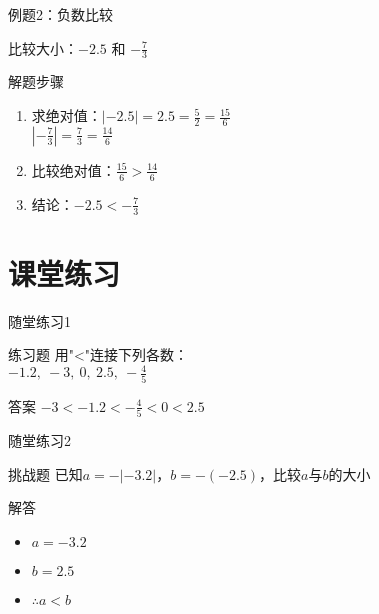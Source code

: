 \documentclass{ctexbeamer}
\begin{document}
\begin{frame}{例题2：负数比较}
    \begin{example}
        比较大小：$-2.5$ 和 $-\frac{7}{3}$
    \end{example}
    
    \pause
    \begin{block}{解题步骤}
        \begin{enumerate}
            \item 求绝对值：$| -2.5 | = 2.5 = \frac{5}{2} = \frac{15}{6}$\\
            $| -\frac{7}{3} | = \frac{7}{3} = \frac{14}{6}$
            \item 比较绝对值：$\frac{15}{6} > \frac{14}{6}$
            \item 结论：$-2.5 < -\frac{7}{3}$
        \end{enumerate}
    \end{block}
\end{frame}

\section{课堂练习}
\begin{frame}{随堂练习1}
    \begin{block}{练习题}
        用"<"连接下列各数：\\
        $-1.2,\ -3,\ 0,\ 2.5,\ -\frac{4}{5}$
    \end{block}
    
    \pause
    \begin{alertblock}{答案}
        $-3 < -1.2 < -\frac{4}{5} < 0 < 2.5$
    \end{alertblock}
\end{frame}

\begin{frame}{随堂练习2}
    \begin{block}{挑战题}
        已知$a = -|-3.2|$，$b = -(-2.5)$，比较$a$与$b$的大小
    \end{block}
    
    \pause
    \begin{alertblock}{解答}
        \begin{itemize}
            \item $a = -3.2$
            \item $b = 2.5$
            \item $\therefore a < b$
        \end{itemize}
    \end{alertblock}
\end{frame}
\end{document}
